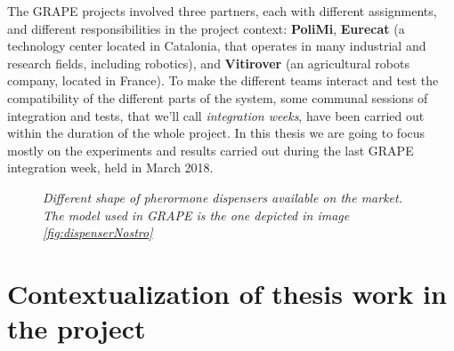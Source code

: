 The \ac{GRAPE} projects involved three partners, each with different assignments, and different responsibilities in the project context: \textbf{PoliMi}, \textbf{Eurecat} (a technology center located in Catalonia, that operates in many industrial and research fields, including robotics), and \textbf{Vitirover} (an agricultural robots company, located in France).
To make the different teams interact and test the compatibility of the different parts of the system, some communal sessions of integration and tests, that we'll call \textit{integration weeks}, have been carried out within the duration of the whole project. In this thesis we are going to focus mostly on the experiments and results carried out during the last \ac{GRAPE} integration week, held in March 2018.

\begin{figure}
	\centering
	\qquad
	\qquad
	\caption{\textit{Different shape of pherormone dispensers available on the market. The model used in \ac{GRAPE} is the one depicted in image \ref{fig:dispenserNostro}}}
	\label{fig:dispensers}
\end{figure}


\section{Contextualization of thesis work in the project} \label{sec:thesisInGrape}

